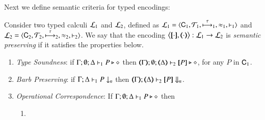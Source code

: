 \documentclass[runningheads]{llncs}
\begin{document}
{\begin{example}
\end{example}

Next we define semantic criteria for typed encodings:


\begin{definition}%
\label{def:ep}
       Consider two typed calculi $\mathcal{L}_1$ and  $\mathcal{L}_2$, defined as 
        $\mathcal{L}_1=\langle \mathsf{C}_1, {\cal{T}}_1, \stackrel{\tau}{\longmapsto}_1, \approx_1, \vdash_1 \rangle$
       and $\mathcal{L}_2=\langle \mathsf{C}_2, {\cal{T}}_2, \stackrel{\tau}{\longmapsto}_2, \approx_2, \vdash_2 \rangle$.
We say that the encoding $\enco{\map{\cdot}, \mapt{\cdot}}: \tyl{L}_1 \to \tyl{L}_2$ is   \emph{semantic preserving}
if it satisfies the properties below.
	
	\begin{enumerate}[1.]
		\item \emph{Type Soundness}:
	if
	$\Gamma; \emptyset; \Delta \vdash_1 P \triangleright \diamond$ then 
	$\mapt{\Gamma}; \emptyset; \mapt{\Delta} \proves_2 \map{P} \hastype \Proc$,  
	for any   $P$ in $\mathsf{C}_1$.

			\item \emph{Barb Preserving}: if $\Gamma; \Delta \vdash_1 P \downarrow_{n}$
		then $\mapt{\Gamma}; \mapt{\Delta} \proves_2 \map{P} \Barb{n}$.

	\item \emph{Operational Correspondence}: If $\Gamma; \emptyset; \Delta \vdash_1 P \triangleright \diamond$ then
		\begin{enumerate}
			\item	{}
				

\end{enumerate}
\end{enumerate}
\end{definition}}
\end{document}
